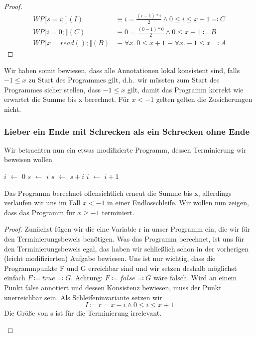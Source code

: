 \documentclass[hidelinks]{article}
\newcommand\Let[2]{\State #1 $\gets$ #2}
\theoremstyle{plain}
\theoremstyle{definition}
\theoremstyle{rem}
\begin{document}
\begin{sloppypar}
\begin{proof}
\begin{align*}
WP\llbracket s=i;\rrbracket(I)&\equiv i=\frac{(i-1)*i}{2}\wedge 0\le i\le x+1\eqqcolon C\\
WP\llbracket i=0;\rrbracket(C)&\equiv 0=\frac{(0-1)*0}{2}\wedge 0\le x+1\coloneqq B\\
WP\llbracket x=read();\rrbracket(B)&\equiv \forall x.\ 0\le x+1\equiv \forall x. -1\le x \eqqcolon A
\end{align*}
\end{proof}
Wir haben somit bewiesen, dass alle Annotationen lokal konsistent sind, falls $-1\le x$ zu Start des Programmes gilt, d.h.\ wir müssten zum Start des Programmes sicher stellen, dass $-1\le x$ gilt, damit das Programm korrekt wie erwartet die Summe bis x berechnet. Für $x<-1$ gelten gelten die Zusicherungen nicht.
\subsubsection{Lieber ein Ende mit Schrecken als ein Schrecken ohne Ende}
Wir betrachten nun ein etwas modifizierte Programm, dessen Terminierung wir beweisen wollen
\begin{algorithm}[H]
    \begin{algorithmic}[1]
	\Let{$i$}{$0$}
	\Let{$s$}{$i$}
		\Let{$s$}{$s+i$}
		\Let{$i$}{$i+1$}
	\EndWhile
	\State {}
  \end{algorithmic}
\end{algorithm}
Das Programm berechnet offensichtlich erneut die Summe bis x, allerdings verlaufen wir uns im Fall $x<-1$ in einer Endlosschleife. Wir wollen nun zeigen, dass das Programm für $x\ge -1$ terminiert.
\begin{proof}
Zunächst fügen wir die eine Variable r in unser Programm ein, die wir für den Terminierungsbeweis benötigen. Was das Programm berechnet, ist uns für den Terminierungsbeweis egal, das haben wir schließlich schon in der vorherigen (leicht modifizierten) Aufgabe bewiesen. Uns ist nur wichtig, dass die Programmpunkte F und G erreichbar sind und wir setzen deshalb möglichst einfach $F\coloneqq true\eqqcolon G$. Achtung: $F\coloneqq false\eqqcolon G$ wäre falsch. Wird an einem Punkt false annotiert und dessen Konsistenz bewiesen, muss der Punkt unerreichbar sein. Als Schleifeninvariante setzen wir
\begin{equation*} 
I\coloneqq r=x-i\wedge 0\le i\le x+1 
\end{equation*}
Die Größe von s ist für die Terminierung irrelevant.
\begin{figure}[H]

\end{figure}
\end{proof}
\end{sloppypar}
\end{document}
